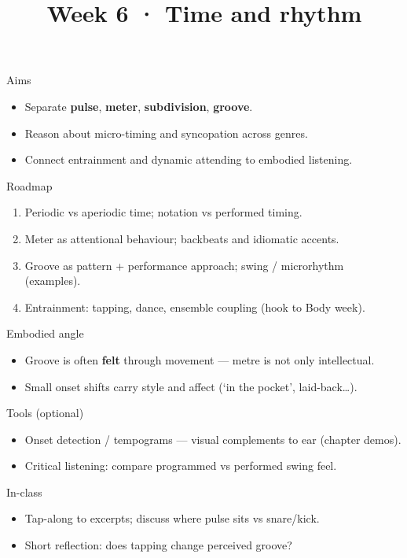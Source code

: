\documentclass[aspectratio=169]{beamer}
\title{Week 6 · Time and rhythm}
\subtitle{\coursename}
\institute{\instituteuo}
\date{}
\begin{document}
\begin{frame}
  \titlepage
\end{frame}

\begin{frame}{Aims}
  \begin{itemize}
    \item Separate \textbf{pulse}, \textbf{meter}, \textbf{subdivision}, \textbf{groove}.
    \item Reason about micro-timing and syncopation across genres.
    \item Connect entrainment and dynamic attending to embodied listening.
  \end{itemize}
\end{frame}

\begin{frame}{Roadmap}
  \begin{enumerate}
    \item Periodic vs aperiodic time; notation vs performed timing.
    \item Meter as attentional behaviour; backbeats and idiomatic accents.
    \item Groove as pattern + performance approach; swing / microrhythm (examples).
    \item Entrainment: tapping, dance, ensemble coupling (hook to Body week).
  \end{enumerate}
\end{frame}

\begin{frame}{Embodied angle}
  \begin{itemize}
    \item Groove is often \textbf{felt} through movement — metre is not only intellectual.
    \item Small onset shifts carry style and affect (`in the pocket', laid-back\ldots).
  \end{itemize}
\end{frame}

\begin{frame}{Tools (optional)}
  \begin{itemize}
    \item Onset detection / tempograms — visual complements to ear (chapter demos).
    \item Critical listening: compare programmed vs performed swing feel.
  \end{itemize}
\end{frame}

\begin{frame}{In-class}
  \begin{itemize}
    \item Tap-along to excerpts; discuss where pulse sits vs snare/kick.
    \item Short reflection: does tapping change perceived groove?
  \end{itemize}
\end{frame}
\end{document}
